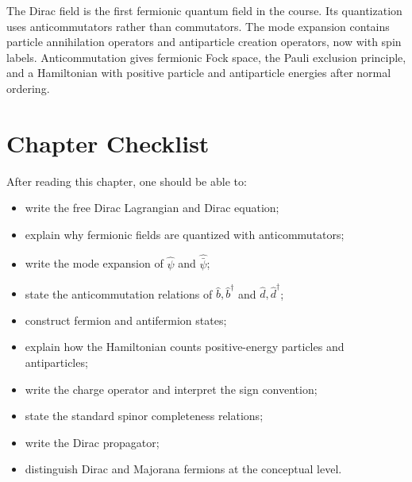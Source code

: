 \begin{summarybox}
The Dirac field is the first fermionic quantum field in the course. Its
quantization uses anticommutators rather than commutators. The mode expansion
contains particle annihilation operators and antiparticle creation operators,
now with spin labels. Anticommutation gives fermionic Fock space, the Pauli
exclusion principle, and a Hamiltonian with positive particle and antiparticle
energies after normal ordering.
\end{summarybox}

\section{Chapter Checklist}

After reading this chapter, one should be able to:
\begin{itemize}
    \item write the free Dirac Lagrangian and Dirac equation;
    \item explain why fermionic fields are quantized with anticommutators;
    \item write the mode expansion of \(\hat\psi\) and \(\hat{\bar\psi}\);
    \item state the anticommutation relations of \(\hat b,\hat b^\dagger\) and
    \(\hat d,\hat d^\dagger\);
    \item construct fermion and antifermion states;
    \item explain how the Hamiltonian counts positive-energy particles and
    antiparticles;
    \item write the charge operator and interpret the sign convention;
    \item state the standard spinor completeness relations;
    \item write the Dirac propagator;
    \item distinguish Dirac and Majorana fermions at the conceptual level.
\end{itemize}
